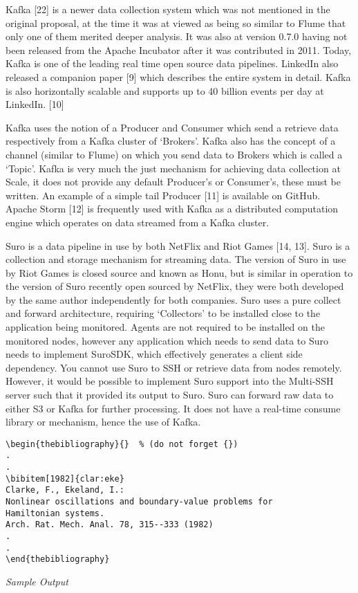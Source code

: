\documentclass{llncs}
\begin{document}
Kafka [22] is a newer data collection system which was not mentioned in the original proposal, at the time it was at viewed as being so similar to Flume that only one of them merited deeper analysis. It was also at version 0.7.0 having not been released from the Apache Incubator after it was contributed in 2011. Today, Kafka is one of the leading real time open source data pipelines. LinkedIn also released a companion paper [9] which describes the entire system in detail. Kafka is also horizontally scalable and supports up to 40 billion events per day at LinkedIn. [10]

Kafka uses the notion of a Producer and Consumer which send a retrieve data respectively from a Kafka cluster of ‘Brokers’. Kafka also has the concept of a channel (similar to Flume) on which you send data to Brokers which is called a ‘Topic’. Kafka is very much the just mechanism for achieving data collection at Scale, it does not provide any default Producer’s or Consumer’s, these must be written. An example of a simple tail Producer [11] is available on GitHub. Apache Storm [12] is frequently used with Kafka as a distributed computation engine which operates on data streamed from a Kafka cluster.

Suro is a data pipeline in use by both NetFlix and Riot Games [14, 13]. Suro is a collection and storage mechanism for streaming data. The version of Suro in use by Riot Games is closed source and known as Honu, but is similar in operation to the version of Suro recently open sourced by NetFlix, they were both developed by the same author independently for both companies. Suro uses a pure collect and forward architecture, requiring ‘Collectors’ to be installed close to the application being monitored. Agents are not required to be installed on the monitored nodes, however any application which needs to send data to Suro needs to implement SuroSDK, which effectively generates a client side dependency. You cannot use Suro to SSH or retrieve data from nodes remotely. However, it would be possible to implement Suro support into the Multi-SSH server such that it provided its output to Suro. Suro can forward raw data to either S3 or Kafka for further processing. It does not have a real-time consume library or mechanism, hence the use of Kafka.

\newpage
\begin{verbatim}
\begin{thebibliography}{}  % (do not forget {})
.
.
\bibitem[1982]{clar:eke}
Clarke, F., Ekeland, I.:
Nonlinear oscillations and boundary-value problems for
Hamiltonian systems.
Arch. Rat. Mech. Anal. 78, 315--333 (1982)
.
.
\end{thebibliography}
\end{verbatim}
{\itshape Sample Output}
\bibauthoryear
%
\end{document}
